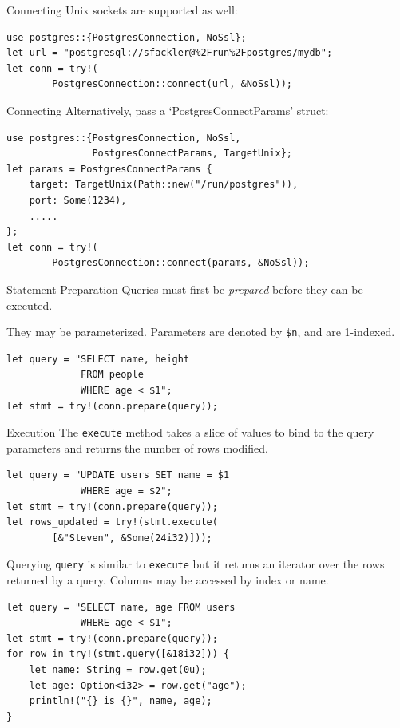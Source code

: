 \documentclass{beamer}
\begin{document}
\begin{frame}[fragile]{Connecting}
	Unix sockets are supported as well:
	\begin{verbatim}
use postgres::{PostgresConnection, NoSsl};
let url = "postgresql://sfackler@%2Frun%2Fpostgres/mydb";
let conn = try!(
        PostgresConnection::connect(url, &NoSsl));
	\end{verbatim}	
\end{frame}

\begin{frame}[fragile]{Connecting}
	Alternatively, pass a `PostgresConnectParams' struct:
	\begin{verbatim}
use postgres::{PostgresConnection, NoSsl,
               PostgresConnectParams, TargetUnix};
let params = PostgresConnectParams {
    target: TargetUnix(Path::new("/run/postgres")),
    port: Some(1234),
    .....
};
let conn = try!(
        PostgresConnection::connect(params, &NoSsl));
	\end{verbatim}
\end{frame}

\begin{frame}[fragile]{Statement Preparation}
    Queries must first be \emph{prepared} before they can be executed.

    They may be parameterized. Parameters are denoted by \verb!$n!, and are
    1-indexed.
    \begin{verbatim}
let query = "SELECT name, height
             FROM people
             WHERE age < $1";
let stmt = try!(conn.prepare(query));
    \end{verbatim}
\end{frame}

\begin{frame}[fragile]{Execution}
    The \verb!execute! method takes a slice of values to bind to the query
    parameters and returns the number of rows modified.
    \begin{verbatim}
let query = "UPDATE users SET name = $1
             WHERE age = $2";
let stmt = try!(conn.prepare(query));
let rows_updated = try!(stmt.execute(
        [&"Steven", &Some(24i32)]));
    \end{verbatim}
\end{frame}

\begin{frame}[fragile]{Querying}
    \verb!query! is similar to \verb!execute! but it returns an iterator over
    the rows returned by a query. Columns may be accessed by index or name.
    \begin{verbatim}
let query = "SELECT name, age FROM users
             WHERE age < $1";
let stmt = try!(conn.prepare(query));
for row in try!(stmt.query([&18i32])) {
    let name: String = row.get(0u);
    let age: Option<i32> = row.get("age");
    println!("{} is {}", name, age);
}
    \end{verbatim}
\end{frame}
\end{document}
